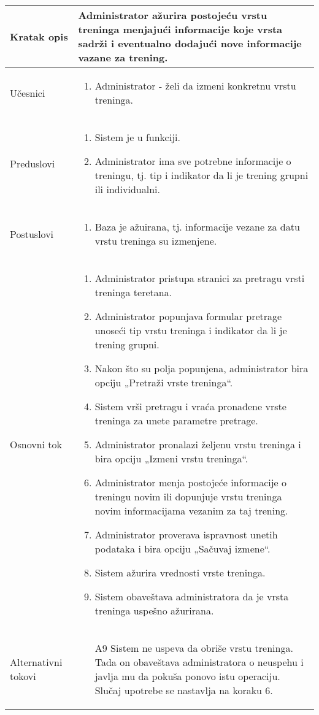 \documentclass[../main.tex]{subfiles}
\begin{document}
\begin{longtable}{| p{} | p{} |} 

\hline
    Kratak opis &  Administrator ažurira postojeću vrstu treninga menjajući informacije koje vrsta sadrži i eventualno dodajući nove informacije vazane za trening.\\ 
\hline    
    Učesnici & 
    	\begin{enumerate}
        \item Administrator - želi da izmeni konkretnu vrstu treninga.
     \end{enumerate}\\
\hline
   Preduslovi & \begin{enumerate}
       \item Sistem je u funkciji.
       \item Administrator ima sve potrebne informacije o treningu, tj. tip i indikator da li je trening grupni ili individualni.
   \end{enumerate}\\
\hline  
    Postuslovi & \begin{enumerate}
        \item Baza je ažuirana, tj. informacije vezane za datu vrstu treninga su izmenjene.
    \end{enumerate}\\
\hline
    Osnovni tok & \begin{enumerate}
        \item Administrator pristupa stranici za pretragu vrsti treninga teretana.
        \item Administrator popunjava formular pretrage unoseći tip vrstu treninga i indikator da li je trening grupni.
        \item Nakon što su polja popunjena, administrator bira opciju „Pretraži vrste treninga“.
        \item Sistem vrši pretragu i vraća pronađene vrste treninga za unete parametre pretrage.
        \item Administrator pronalazi željenu vrstu treninga i bira opciju „Izmeni vrstu treninga“.
        \item Administrator menja postojeće informacije o treningu novim ili dopunjuje vrstu treninga novim informacijama vezanim za taj trening.
        \item Administrator proverava ispravnost unetih podataka i bira opciju „Sačuvaj izmene“.
        \item Sistem ažurira vrednosti vrste treninga.
        \item Sistem obaveštava administratora da je vrsta treninga uspešno ažurirana.
    \end{enumerate}\\
\hline
    Alternativni tokovi & \begin{itemize}
        \item[A9]  Sistem ne uspeva da obriše vrstu treninga. Tada on obaveštava administratora o neuspehu i javlja mu da pokuša ponovo istu operaciju. Slučaj upotrebe se nastavlja na koraku 6.


\end{itemize}
\end{longtable}
\end{document}
